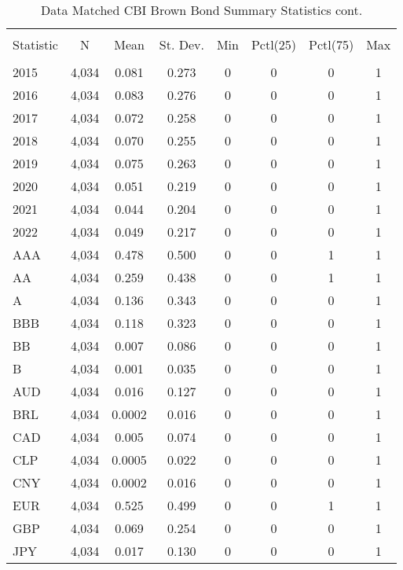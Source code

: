 \begin{table}[H] \centering 
  \footnotesize
  \caption{Data Matched CBI Brown Bond Summary Statistics cont.} 
  \label{} 
\begin{tabular}{@{\extracolsep{5pt}}lccccccc} 
\\[-1.8ex]\hline 
\hline \\[-1.8ex] 
Statistic & \multicolumn{1}{c}{N} & \multicolumn{1}{c}{Mean} & \multicolumn{1}{c}{St. Dev.} & \multicolumn{1}{c}{Min} & \multicolumn{1}{c}{Pctl(25)} & \multicolumn{1}{c}{Pctl(75)} & \multicolumn{1}{c}{Max} \\ 
\hline \\[-1.8ex] 
2015 & 4,034 & 0.081 & 0.273 & 0 & 0 & 0 & 1 \\ 
2016 & 4,034 & 0.083 & 0.276 & 0 & 0 & 0 & 1 \\ 
2017 & 4,034 & 0.072 & 0.258 & 0 & 0 & 0 & 1 \\ 
2018 & 4,034 & 0.070 & 0.255 & 0 & 0 & 0 & 1 \\ 
2019 & 4,034 & 0.075 & 0.263 & 0 & 0 & 0 & 1 \\ 
2020 & 4,034 & 0.051 & 0.219 & 0 & 0 & 0 & 1 \\ 
2021 & 4,034 & 0.044 & 0.204 & 0 & 0 & 0 & 1 \\ 
2022 & 4,034 & 0.049 & 0.217 & 0 & 0 & 0 & 1 \\ 
AAA & 4,034 & 0.478 & 0.500 & 0 & 0 & 1 & 1 \\ 
AA & 4,034 & 0.259 & 0.438 & 0 & 0 & 1 & 1 \\ 
A & 4,034 & 0.136 & 0.343 & 0 & 0 & 0 & 1 \\ 
BBB & 4,034 & 0.118 & 0.323 & 0 & 0 & 0 & 1 \\ 
BB & 4,034 & 0.007 & 0.086 & 0 & 0 & 0 & 1 \\ 
B & 4,034 & 0.001 & 0.035 & 0 & 0 & 0 & 1 \\ 
AUD & 4,034 & 0.016 & 0.127 & 0 & 0 & 0 & 1 \\ 
BRL & 4,034 & 0.0002 & 0.016 & 0 & 0 & 0 & 1 \\ 
CAD & 4,034 & 0.005 & 0.074 & 0 & 0 & 0 & 1 \\ 
CLP & 4,034 & 0.0005 & 0.022 & 0 & 0 & 0 & 1 \\ 
CNY & 4,034 & 0.0002 & 0.016 & 0 & 0 & 0 & 1 \\ 
EUR & 4,034 & 0.525 & 0.499 & 0 & 0 & 1 & 1 \\ 
GBP & 4,034 & 0.069 & 0.254 & 0 & 0 & 0 & 1 \\ 
JPY & 4,034 & 0.017 & 0.130 & 0 & 0 & 0 & 1 \\ 

\end{tabular}
\end{table}
